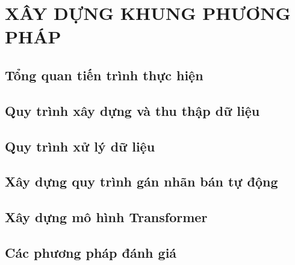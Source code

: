 \chapter{XÂY DỰNG KHUNG PHƯƠNG PHÁP}
\label{Chapter3}

\section{Tổng quan tiến trình thực hiện}



\section{Quy trình xây dựng và thu thập dữ liệu}



\section{Quy trình xử lý dữ liệu}



\section{Xây dựng quy trình gán nhãn bán tự động}



\section{Xây dựng mô hình Transformer}



\section{Các phương pháp đánh giá}


